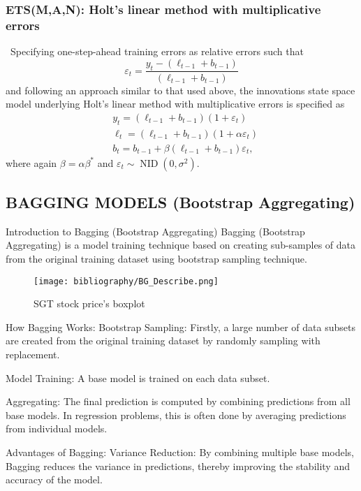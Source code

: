 \documentclass{ieeeojies}
\begin{document}
\subsubsection{ETS(M,A,N): Holt’s linear method with multiplicative errors} \
Specifying one-step-ahead training errors as relative errors such that
$$
\varepsilon_t=\frac{y_t-\left(\ell_{t-1}+b_{t-1}\right)}{\left(\ell_{t-1}+b_{t-1}\right)}
$$
and following an approach similar to that used above, the innovations state space model underlying Holt's linear method with multiplicative errors is specified as
$$
\begin{aligned}
& y_t=\left(\ell_{t-1}+b_{t-1}\right)\left(1+\varepsilon_t\right) \\
& \ell_t=\left(\ell_{t-1}+b_{t-1}\right)\left(1+\alpha \varepsilon_t\right) \\
& b_t=b_{t-1}+\beta\left(\ell_{t-1}+b_{t-1}\right) \varepsilon_t,
\end{aligned}
$$
where again $\beta=\alpha \beta^*$ and $\varepsilon_t \sim \operatorname{NID}\left(0, \sigma^2\right)$.

\subsection{BAGGING MODELS (Bootstrap Aggregating)}
Introduction to Bagging (Bootstrap Aggregating)
Bagging (Bootstrap Aggregating) is a model training technique based on creating sub-samples of data from the original training dataset using bootstrap sampling technique.

\begin{figure}[H]
    \centering
    \begin{minipage}{0.23\textwidth}
    \centering
    \texttt{[image: bibliography/BG\_Describe.png]}
    \caption{SGT stock price's boxplot}
    \label{fig:1}
    \end{minipage}
    \hfill
\end{figure}
How Bagging Works:
Bootstrap Sampling: Firstly, a large number of data subsets are created from the original training dataset by randomly sampling with replacement.

Model Training: A base model is trained on each data subset.

Aggregating: The final prediction is computed by combining predictions from all base models. In regression problems, this is often done by averaging predictions from individual models.

Advantages of Bagging:
Variance Reduction: By combining multiple base models, Bagging reduces the variance in predictions, thereby improving the stability and accuracy of the model.
\end{document}
